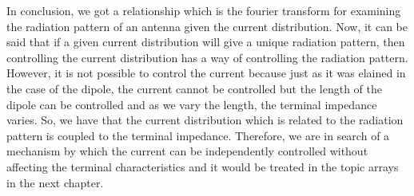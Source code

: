 In conclusion, we got a relationship which is the  fourier transform for examining the radiation pattern of an antenna given the current distribution. Now, it can be said that if a given current distribution will give a unique radiation pattern, then controlling the current distribution has a way of controlling the radiation pattern. However, it is not possible to control the current because just as it was elained in the case of the dipole, the current cannot be controlled but the length of the dipole can be controlled and as we vary the length, the terminal impedance varies. So, we have that the current distribution which is related to the radiation pattern is coupled to the terminal impedance. Therefore, we are in search of a mechanism by which the current can be independently controlled without affecting the terminal characteristics and it would be treated in the topic arrays in the next chapter.